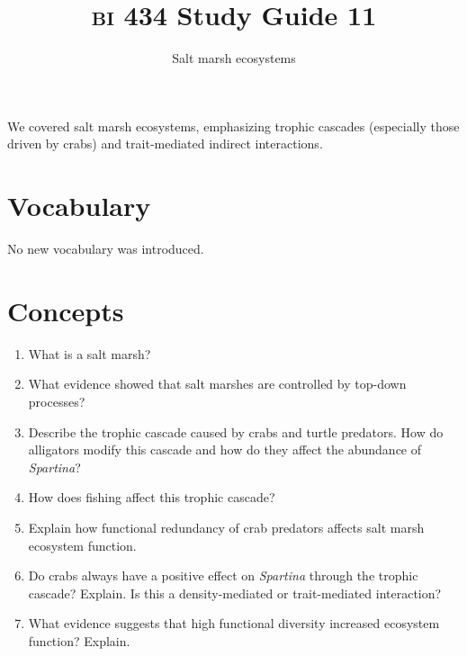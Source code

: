 \documentclass[letterpaper]{tufte-handout}
\title{{\scshape bi} 434 Study Guide 11}
\author{Salt marsh ecosystems}
\date{} %
\begin{document}
\maketitle	%


We covered salt marsh ecosystems, emphasizing trophic cascades (especially those driven by crabs) and trait-mediated indirect interactions.

\section*{Vocabulary}

No new vocabulary was introduced.

\section*{Concepts}

\begin{enumerate}

\item What is a salt marsh?

\item What evidence showed that salt marshes are controlled by top-down processes?
	
\item Describe the trophic cascade caused by crabs and turtle predators.   How do alligators modify this cascade and how do they affect the abundance of \textit{Spartina}?

\item
  How does fishing affect this trophic cascade? 
  
\item Explain how functional redundancy of crab predators affects salt marsh ecosystem function.

\item
  Do crabs always have a positive effect on \textit{Spartina} through the trophic cascade? Explain. Is this a density-mediated or trait-mediated interaction?

\item
  What evidence suggests that high functional diversity increased ecosystem function? Explain.

\end{enumerate}
\end{document}
